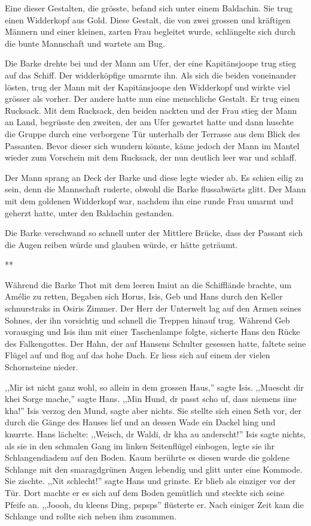 \documentclass[11pt,titlepage,a5paper]{book}
\newcommand{\sterne}{\par{\centering ***\par}}
\begin{document}
Eine dieser Gestalten, die grösste, befand sich unter einem Baldachin. Sie trug einen Widderkopf aus Gold. Diese Gestalt, die von zwei grossen und kräftigen Männern und einer kleinen, zarten Frau begleitet wurde, schlängelte sich durch die bunte Mannschaft und wartete am Bug.

Die Barke drehte bei und der Mann am Ufer, der eine Kapitänsjoope trug stieg auf das Schiff. Der widderköpfige umarmte ihn. Als sich die beiden voneinander lösten, trug der Mann mit der Kapitänsjoope den Widderkopf und wirkte viel grösser als vorher. Der andere hatte nun eine  menschliche Gestalt. Er trug einen Rucksack. Mit dem Rucksack, den beiden nackten und der Frau stieg der Mann an Land, begrüsste den zweiten, der am Ufer gewartet hatte und dann huschte die Gruppe durch eine verborgene Tür unterhalb der Terrasse aus dem Blick des Passanten. Bevor dieser sich wundern könnte, käme jedoch der Mann im Mantel wieder zum Vorschein mit dem Rucksack, der nun deutlich leer war und schlaff.

Der Mann sprang an Deck der Barke und diese legte wieder ab. Es schien eilig zu sein, denn die Mannschaft ruderte, obwohl die Barke flussabwärts glitt. Der Mann mit dem goldenen Widderkopf war, nachdem ihn eine runde Frau umarmt und geherzt hatte, unter den Baldachin gestanden.

Die Barke verschwand so schnell unter der Mittlere Brücke, dass der Passant sich die Augen reiben würde und glauben würde, er hätte geträumt.

\sterne

Während die Barke Thot mit dem leeren Imiut an die Schifflände brachte, um Amélie zu retten, Begaben sich Horus, Isis, Geb und Hans durch den Keller schnurstraks in Osiris Zimmer. Der Herr der Unterwelt lag auf den Armen seines Sohnes, der ihn vorsichtig und schnell die Treppen hinauf trug. Während Geb vorausging und Isis ihm mit einer Taschenlampe folgte, sicherte Hans den Rücke des Falkengottes. Der Hahn, der auf Hansens Schulter gesessen hatte, faltete seine Flügel auf und flog auf das hohe Dach. Er liess sich auf einem der vielen Schornsteine nieder.

,,Mir ist nicht ganz wohl, so allein in dem grossen Haus,'' sagte Isis. ,,Muescht dir khei Sorge mache,'' sagte Hans. ,,Min Hund, dr passt scho uf, dass niemens iine kha!'' Isis verzog den Mund, sagte aber nichts. Sie stellte sich einen Seth vor, der durch die Gänge des Hauses lief und an dessen Wade ein Dackel hing und knurrte. Hans lächelte: ,,Weisch, dr Waldi, dr kha au anderscht!'' Isis sagte nichts, als sie in den schmalen Gang im linken Seitenflügel einbogen, legte sie ihr Schlangendiadem auf den Boden. Kaum berührte es diesen wurde die goldene Schlange mit den smaragdgrünen Augen lebendig und glitt unter eine Kommode. Sie zischte. ,,Nit schlecht!'' sagte Hans und grinste. Er blieb als einziger vor der Tür. Dort machte er es sich auf dem Boden gemütlich und steckte sich seine Pfeife an. ,,Joooh, du kleens Ding, pspsps'' flüsterte er. Nach einiger Zeit kam die Schlange und rollte sich neben ihm zusammen.
\end{document}
